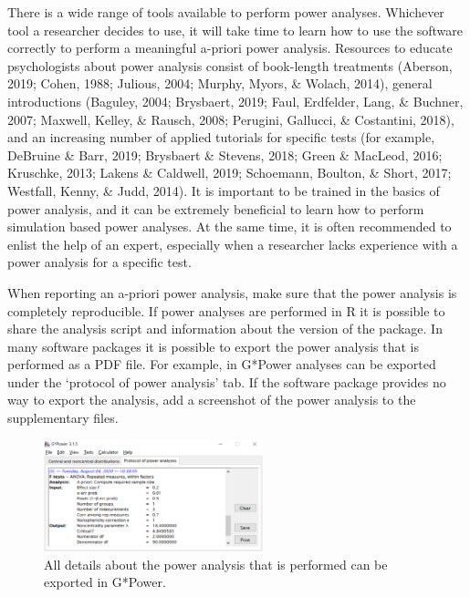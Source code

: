 \documentclass[
  english,
  ,jou, a4paper,floatsintext]{apa6}
\begin{document}
There is a wide range of tools available to perform power analyses. Whichever tool a researcher decides to use, it will take time to learn how to use the software correctly to perform a meaningful a-priori power analysis. Resources to educate psychologists about power analysis consist of book-length treatments (Aberson, 2019; Cohen, 1988; Julious, 2004; Murphy, Myors, \& Wolach, 2014), general introductions (Baguley, 2004; Brysbaert, 2019; Faul, Erdfelder, Lang, \& Buchner, 2007; Maxwell, Kelley, \& Rausch, 2008; Perugini, Gallucci, \& Costantini, 2018), and an increasing number of applied tutorials for specific tests (for example, DeBruine \& Barr, 2019; Brysbaert \& Stevens, 2018; Green \& MacLeod, 2016; Kruschke, 2013; Lakens \& Caldwell, 2019; Schoemann, Boulton, \& Short, 2017; Westfall, Kenny, \& Judd, 2014). It is important to be trained in the basics of power analysis, and it can be extremely beneficial to learn how to perform simulation based power analyses. At the same time, it is often recommended to enlist the help of an expert, especially when a researcher lacks experience with a power analysis for a specific test.

When reporting an a-priori power analysis, make sure that the power analysis is completely reproducible. If power analyses are performed in R it is possible to share the analysis script and information about the version of the package. In many software packages it is possible to export the power analysis that is performed as a PDF file. For example, in G*Power analyses can be exported under the `protocol of power analysis' tab. If the software package provides no way to export the analysis, add a screenshot of the power analysis to the supplementary files.

\begin{figure}
\includegraphics[width=240px]{images/gpowprotocol} \caption{All details about the power analysis that is performed can be exported in G*Power.}\label{fig:gpowprotocol}
\end{figure}
\end{document}
